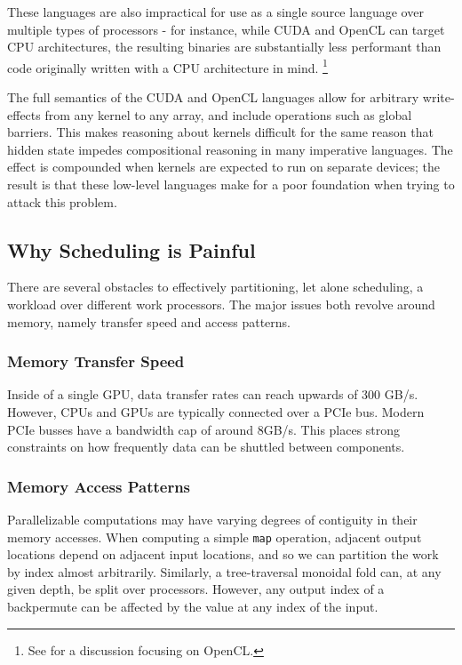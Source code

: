 \documentclass[a4paper,12pt]{article}
\begin{document}
These languages are also impractical for use as a single source language over multiple types of processors - for instance, while CUDA and OpenCL can target CPU architectures, the resulting binaries are substantially less performant than code originally written with a CPU architecture in mind. \footnote{See \citet{jie_shen_performance_2013} for a discussion focusing on OpenCL.}

The full semantics of the CUDA and OpenCL languages allow for arbitrary write-effects from any kernel to any array, and include operations such as global barriers. 
This makes reasoning about kernels difficult for the same reason that hidden state impedes compositional reasoning in many imperative languages. 
The effect is compounded when kernels are expected to run on separate devices; the result is that these low-level languages make for a poor foundation when trying to attack this problem.

\subsection{Why Scheduling is Painful}
There are several obstacles to effectively partitioning, let alone scheduling, a workload over different work processors. 
The major issues both revolve around memory, namely transfer speed and access patterns. 

\subsubsection*{Memory Transfer Speed} 
Inside of a single GPU, data transfer rates can reach upwards of 300 GB/s. \citep{gtx-780-spec}
However, CPUs and GPUs are typically connected over a PCIe bus.
Modern PCIe busses have a bandwidth cap of around 8GB/s. \citep{pcie-3-faq}
This places strong constraints on how frequently data can be shuttled between components. 

\subsubsection*{Memory Access Patterns} 
Parallelizable computations may have varying degrees of contiguity in their memory accesses. 
When computing a simple \texttt{map} operation, adjacent output locations depend on adjacent input locations, and so we can partition the work by index almost arbitrarily. 
Similarly, a tree-traversal monoidal fold can, at any given depth, be split over processors. 
However, any output index of a backpermute can be affected by the value at any index of the input.
\end{document}
